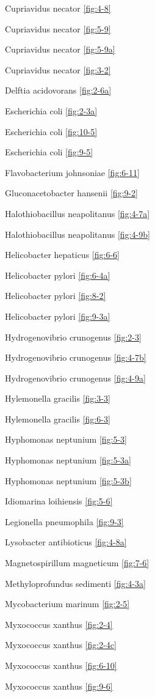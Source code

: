 \documentclass[]{tufte-book}
\begin{document}
Cupriavidus necator \ref{fig:4-8}

Cupriavidus necator \ref{fig:5-9}

Cupriavidus necator \ref{fig:5-9a}

Cupriavidus necator \ref{fig:3-2}

Delftia acidovorans \ref{fig:2-6a}

Escherichia coli \ref{fig:2-3a}

Escherichia coli \ref{fig:10-5}

Escherichia coli \ref{fig:9-5}

Flavobacterium johnsoniae \ref{fig:6-11}

Gluconacetobacter hansenii \ref{fig:9-2}

Halothiobacillus neapolitanus \ref{fig:4-7a}

Halothiobacillus neapolitanus \ref{fig:4-9b}

Helicobacter hepaticus \ref{fig:6-6}

Helicobacter pylori \ref{fig:6-4a}

Helicobacter pylori \ref{fig:8-2}

Helicobacter pylori \ref{fig:9-3a}

Hydrogenovibrio crunogenus \ref{fig:2-3}

Hydrogenovibrio crunogenus \ref{fig:4-7b}

Hydrogenovibrio crunogenus \ref{fig:4-9a}

Hylemonella gracilis \ref{fig:3-3}

Hylemonella gracilis \ref{fig:6-3}

Hyphomonas neptunium \ref{fig:5-3}

Hyphomonas neptunium \ref{fig:5-3a}

Hyphomonas neptunium \ref{fig:5-3b}

Idiomarina loihiensis \ref{fig:5-6}

Legionella pneumophila \ref{fig:9-3}

Lysobacter antibioticus \ref{fig:4-8a}

Magnetospirillum magneticum \ref{fig:7-6}

Methyloprofundus sedimenti \ref{fig:4-3a}

Mycobacterium marinum \ref{fig:2-5}

Myxococcus xanthus \ref{fig:2-4}

Myxococcus xanthus \ref{fig:2-4c}

Myxococcus xanthus \ref{fig:6-10}

Myxococcus xanthus \ref{fig:9-6}
\end{document}
